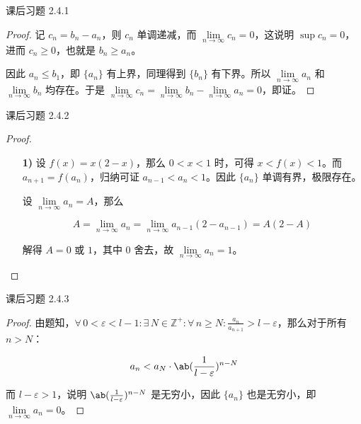 \begin{problem}
	课后习题 2.4.1

	\begin{proof}
		记 $c_n = b_n - a_n$，则 $c_n$ 单调递减，而 $\lim\limits_{n \to \infty} c_n = 0$，这说明 $\sup c_n = 0$，进而 $c_n \ge 0$，也就是 $b_n \ge a_n$。
		
		因此 $a_n \le b_1$，即 $\{a_n\}$ 有上界，同理得到 $\{b_n\}$ 有下界。所以 $\lim\limits_{n \to \infty} a_n$ 和 $\lim\limits_{n \to \infty} b_n$ 均存在。于是 $\lim\limits_{n \to \infty} c_n = \lim\limits_{n \to \infty} b_n - \lim\limits_{n \to \infty} a_n = 0$，即证。
	\end{proof}
\end{problem}

\begin{problem}
	课后习题 2.4.2

	\begin{proof}
		\begin{enumerate}
			\item[\textbf{1)}] 设 $f(x) = x(2 - x)$，那么 $0 < x < 1$ 时，可得 $x < f(x) < 1$。而 $a_{n+1} = f(a_n)$，归纳可证 $a_{n-1} < a_n < 1$。因此 $\{a_n\}$ 单调有界，极限存在。
			
			设 $\lim\limits_{n \to \infty} a_n = A$，那么

			$$
			A = \lim_{n \to \infty} a_n = \lim_{n \to \infty} a_{n-1} (2 - a_{n-1}) = A(2 - A)
			$$

			解得 $A = 0 \text{ 或 } 1$，其中 $0$ 舍去，故 $\lim\limits_{n \to \infty} a_n = 1$。
		\end{enumerate}
	\end{proof}
\end{problem}

\begin{problem}
	课后习题 2.4.3

	\begin{proof}
		由题知，$\forall\,0 < \varepsilon < l - 1: \exists\,N \in \mathbb{Z}^+: \forall\,n \ge N: \frac{a_n}{a_{n+1}} > l - \varepsilon$，那么对于所有 $n > N$：

		$$
		a_n < a_N \cdot \ab(\frac{1}{l - \varepsilon})^{n - N}
		$$

		而 $l - \varepsilon > 1$，说明 $\ab(\frac{1}{l - \varepsilon})^{n - N}$ 是无穷小，因此 $\{a_n\}$ 也是无穷小，即 $\lim\limits_{n \to \infty} a_n = 0$。
	\end{proof}
\end{problem}

